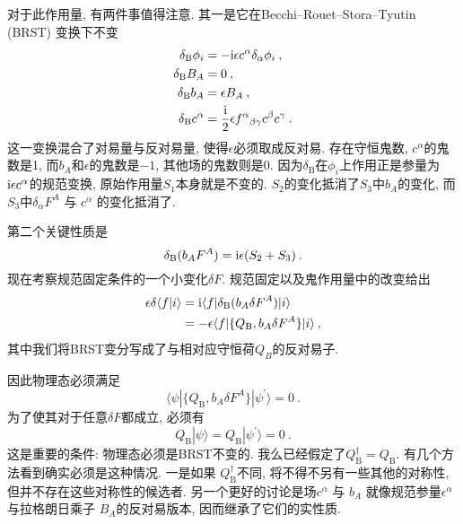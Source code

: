 对于此作用量, 有两件事值得注意. 其一是它在Becchi–Rouet–Stora–Tyutin (BRST) 变换下不变
\begin{subequations}\label{4.2.6}
\begin{align}
\delta_{\mathrm{B}} \phi_{i}&=-\mathrm{i} \epsilon c^{\alpha} \delta_{\alpha} \phi_{i} \:, \label{4.2.6a} \\
\delta_{\mathrm{B}} B_{A} &=0 \:, \label{4.2.6b} \\
\delta_{\mathrm{B}} b_{A} &=\epsilon B_{A} \:, \label{4.2.6c} \\
\delta_{\mathrm{B}} c^{\alpha}&=\frac{\mathrm{i}}{2} \epsilon f^{\alpha}{}_{\beta \gamma}c^{\beta} c^{\gamma} \:. \label{4.2.6d} 
\end{align}
\end{subequations}
这一变换混合了对易量与反对易量, 使得$\epsilon$必须取成反对易. 存在守恒鬼数, $c^{\alpha}$的鬼数是1, 而$b_{A}$和$\epsilon$的鬼数是$-1$, 其他场的鬼数则是0. 因为$\delta_{\mathrm{B}}$在$\phi_{i}$上作用正是参量为$\mathrm{i} \epsilon c^{\alpha}$的规范变换, 原始作用量$S_{1}$本身就是不变的. $S_{2}$的变化抵消了$S_{3}$中$b_{A}$的变化, 
而 $S_{3}$中$\delta_{\alpha} F^{A}$ 与 $c^{\alpha}$ 的变化抵消了.

第二个关键性质是
\begin{equation}
\delta_{\mathrm{B}}(b_{A} F^{A})=\mathrm{i} \epsilon(S_{2}+S_{3}) \:. \label{4.2.7}
\end{equation}
现在考察规范固定条件的一个小变化$\delta F$. 规范固定以及鬼作用量中的改变给出
	\begin{align}
		\epsilon \delta\langle f \vert i\rangle &=\mathrm{i} \langle f |\delta_{\mathrm{B}}(b_{A} \delta F^{A})| i \rangle \nonumber  \\
		&=-\epsilon\langle f |\{Q_{\mathrm{B}}, b_{A} \delta F^{A}\} | i \rangle \:, \label{4.2.8}
	\end{align}
其中我们将BRST变分写成了与相对应守恒荷$Q_B$的反对易子. 

因此物理态必须满足
\begin{equation}
\langle\psi |\{Q_{\mathrm{B}}, b_{A} \delta F^{A} \}| \psi^{\prime}\rangle=0 \:. \label{4.2.9}
\end{equation}
为了使其对于任意$\delta F$都成立, 必须有
\begin{equation}
Q_{\mathrm{B}}|\psi\rangle=Q_{\mathrm{B}}|\psi^{\prime}\rangle=0 \:. \label{4.2.10}
\end{equation}
这是重要的条件: 物理态必须是BRST不变的. 我么已经假定了$Q_{\mathrm{B}}^{\dagger}=Q_{\mathrm{B}}$. 有几个方法看到确实必须是这种情况. 一是如果 $Q_{\mathrm{B}}^{\dagger}$不同, 将不得不另有一些其他的对称性, 但并不存在这些对称性的候选者. 另一个更好的讨论是场$c^{\alpha}$ 与 $b_{A}$ 就像规范参量$\epsilon^{\alpha}$ 与拉格朗日乘子 $B_{A}$的反对易版本, 因而继承了它们的实性质. 

